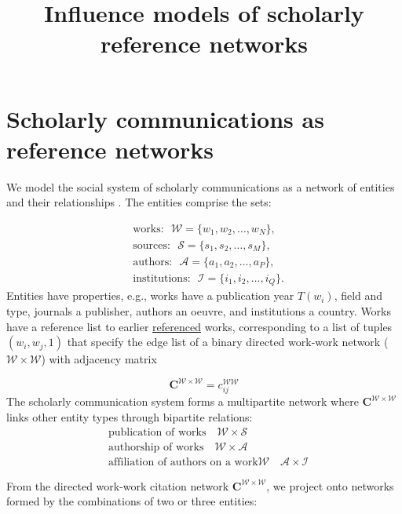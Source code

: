 \documentclass[12pt]{article}
\title{Influence models of scholarly reference networks}
\author{}
\begin{document}
\maketitle

\begin{abstract}

\end{abstract}

\section{Scholarly communications as reference networks}

We model the social system of scholarly communications as a network of entities and their relationships \citep{craneProbabilisticFoundationsStatistical2018}. The entities comprise
the sets: 

\begin{align}
	&\text{works:}\ \ \  \mathcal{W} = \{w_1, w_2, \dots, w_N\},\\
	&\text{sources:}\ \ \  \mathcal{S} = \{s_1, s_2, \dots, s_M\},\\
	&\text{authors:}\ \ \  \mathcal{A} = \{a_1, a_2, \dots, a_P\},\\
	&\text{institutions:}\ \ \  \mathcal{I} = \{i_1, i_2, \dots, i_Q\}.
\end{align}
Entities have properties, e.g., works have a publication year $T(w_i)$, field and type, journals a publisher, authors an oeuvre, and institutions a country. Works have a reference list to earlier \underline{referenced} works, corresponding to a list of tuples $(w_i, w_j, 1)$ that specify the edge list of a binary directed work-work network ($\mathcal{W \times W}$) with adjacency matrix 

$$
\mathbf{C}^{\mathcal{W \times W}} = c^{\mathcal{WW}}_{ij}
$$
The scholarly communication system forms a multipartite network where $\mathbf{C}^{\mathcal{W \times W}}$ links other entity types through bipartite relations:
\begin{align}
	&\text{publication of works} \quad \mathcal{W} \times \mathcal{S} \\
	&\text{authorship of works} \quad \mathcal{W} \times \mathcal{A} \\
	&\text{affiliation of authors on a work} \mathcal{W} \quad \mathcal{A} \times \mathcal{I}
\end{align}

From the directed work-work citation network $\mathbf{C}^{\mathcal{W \times W}}$, we project onto networks formed by the combinations of two or three entities:
\end{document}
